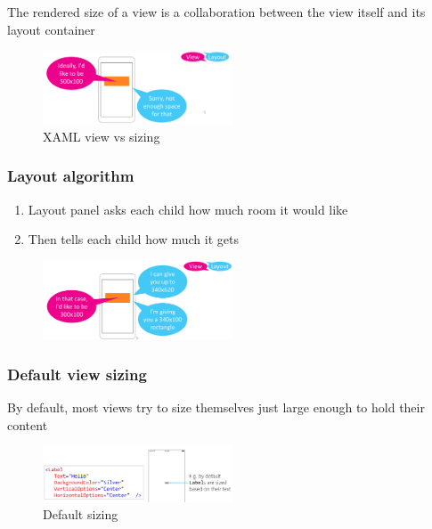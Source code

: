 \documentclass{article}
\begin{document}
The rendered size of a view is a collaboration between the view itself and its layout container

\begin{figure}[H]
    \centering
    \includegraphics[width=0.5\textwidth]{xaml-view-sizing.png}
    \caption{XAML view vs sizing}
\end{figure}

\subsubsection{Layout algorithm}

\begin{enumerate}
    \item Layout panel asks each child how much room it would like
    \item Then tells each child how much it gets
\end{enumerate}


\begin{figure}[H]
    \centering
    \includegraphics[width=0.5\textwidth]{xaml-view-layout.png}
    \caption{}
\end{figure}

\subsubsection{Default view sizing}

By default, most views try to size themselves just large enough to hold their content

\begin{figure}[H]
    \centering
    \includegraphics[width=0.5\textwidth]{xaml-default.png}
    \caption{Default sizing}
\end{figure}
\end{document}
